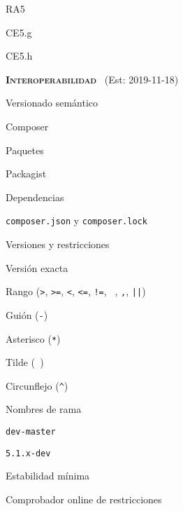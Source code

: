 \begin{longenum}
\begin{longenum}
\begin{longenum}
\begin{longenum}
                \item RA5
                \begin{longenum}
                    \item CE5.g
                    \item CE5.h
                \end{longenum}
            \end{longenum}
        \end{longenum}
    \end{longenum}
    \item \textbf{\textsc{Interoperabilidad}} \ (Est: 2019-11-18)
    \begin{longenum}
        \item Versionado semántico
        \item Composer
        \begin{longenum}
            \item Paquetes
            \item Packagist
            \item Dependencias
            \begin{longenum}
                \item \texttt{composer.json} y \texttt{composer.lock}
            \end{longenum}
            \item Versiones y restricciones
            \begin{longenum}
                \item Versión exacta
                \item Rango (\texttt{>}, \texttt{>=}, \texttt{<}, \texttt{<=}, \texttt{!=}, \texttt{ }, \texttt{,}, \texttt{||})
                \item Guión (\texttt{-})
                \item Asterisco (\texttt{*})
                \item Tilde (\texttt{~})
                \item Circunflejo (\texttt{\^})
                \item Nombres de rama
                \begin{longenum}
                    \item \texttt{dev-master}
                    \item \texttt{5.1.x-dev}
                \end{longenum}
                \item Estabilidad mínima
                \item Comprobador online de restricciones

\end{longenum}
\end{longenum}
\end{longenum}
\end{longenum}
